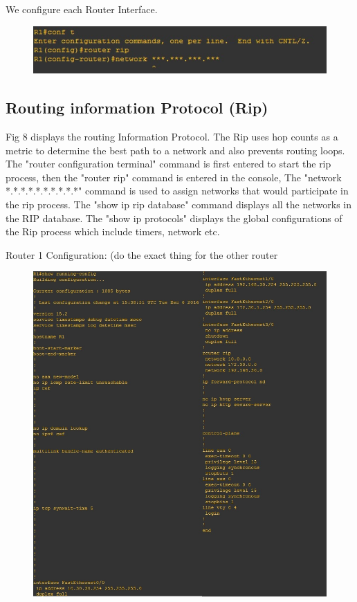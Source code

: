 \documentclass{article}
\begin{document}
We configure each Router Interface.\\


\begin{figure}[H]
	\begin{center}
		\includegraphics[width=0.6
\textwidth]{RouterRip.jpg}
	\end{center}
	\caption{\small  \newline}
	\label{fig:Prd}
\end{figure}
\subsection{Routing information Protocol (Rip)} Fig 8 displays the routing Information Protocol. The Rip uses hop counts as a metric to determine the best path to a network and also prevents routing loops. The "router configuration terminal" command is first entered to start the rip process, then the "router rip" command is entered in the console, The "network *.*.*.*.*.*.*.*.*.*" command is used to assign networks that would participate in the rip process. The "show ip rip database" command displays all the networks in the RIP database. The "show ip protocols" displays the global configurations of the Rip process which include timers, network etc.

Router 1 Configuration: (do the exact thing for the other router

\begin{figure}[H]
	\begin{center}
		\includegraphics[width=0.6
\textwidth]{Routerconfig.jpg}
	\end{center}
	\caption{\small  \newline}
	\label{fig:Prd}
\end{figure}
\end{document}

